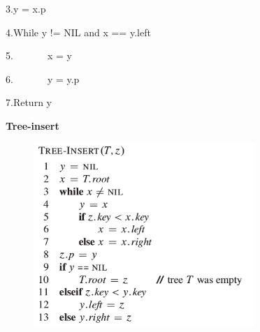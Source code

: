 \documentclass[12pt]{report}
\begin{document}
3.\tab y = x.p\par

4.\tab While y != NIL and x == y.left\par

5.\tab \ \ \ \ \ \ \  x = y\par

6.\tab \ \ \ \ \ \ \  y = y.p\par

7.\tab Return y\par


\vspace{\baselineskip}

\vspace{\baselineskip}

\vspace{\baselineskip}

\vspace{\baselineskip}

\vspace{\baselineskip}

\vspace{\baselineskip}

\vspace{\baselineskip}

\vspace{\baselineskip}

\vspace{\baselineskip}
{\fontsize{14pt}{16.8pt}\selectfont \textbf{Tree-insert}\par}\par


\vspace{\baselineskip}



\begin{figure}[H]
	\begin{Center}
		\includegraphics[width=3.3in,height=2.74in]{./media/image83.png}
	\end{Center}
\end{figure}
\end{document}

